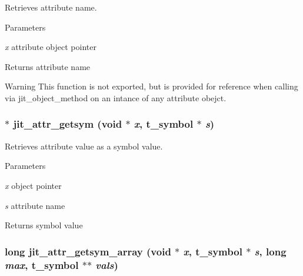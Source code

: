 Retrieves attribute name. 
\begin{DoxyParams}{Parameters}
\item[{\em x}]attribute object pointer\end{DoxyParams}
\begin{DoxyReturn}{Returns}
attribute name
\end{DoxyReturn}
\begin{DoxyWarning}{Warning}
This function is not exported, but is provided for reference when calling via jit\_\-object\_\-method on an intance of any attribute obejct. 
\end{DoxyWarning}
\hypertarget{group__attrmod_ga8e0197009251af617b25f9b27c277c21}{
\subsubsection[{jit\_\-attr\_\-getsym}]{$\ast$ jit\_\-attr\_\-getsym (void $\ast$ {\em x}, \/  {\bf t\_\-symbol} $\ast$ {\em s})}}
\label{group__attrmod_ga8e0197009251af617b25f9b27c277c21}


Retrieves attribute value as a symbol value. 
\begin{DoxyParams}{Parameters}
\item[{\em x}]object pointer \item[{\em s}]attribute name\end{DoxyParams}
\begin{DoxyReturn}{Returns}
symbol value 
\end{DoxyReturn}
\hypertarget{group__attrmod_gae6816dcde85981f51404a2194a4d6c9f}{
\subsubsection[{jit\_\-attr\_\-getsym\_\-array}]{\setlength{\rightskip}{0pt plus 5cm}long jit\_\-attr\_\-getsym\_\-array (void $\ast$ {\em x}, \/  {\bf t\_\-symbol} $\ast$ {\em s}, \/  long {\em max}, \/  {\bf t\_\-symbol} $\ast$$\ast$ {\em vals})}}
\label{group__attrmod_gae6816dcde85981f51404a2194a4d6c9f}


